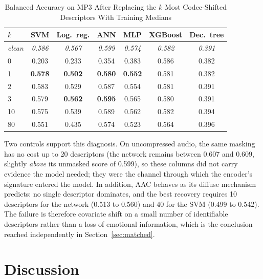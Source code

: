 \documentclass[lettersize,journal]{IEEEtran}
\begin{document}
\begin{table}[!t]
\caption{Balanced Accuracy on MP3 After Replacing the $k$ Most Codec-Shifted Descriptors With Training Medians}
\label{tab:neutralise}
\centering
\footnotesize
\setlength{\tabcolsep}{4pt}
\begin{tabular}{@{}lcccccc@{}}
\toprule
$k$ & SVM & Log.\ reg. & ANN & MLP & XGBoost & Dec.\ tree\\
\midrule
\textit{clean} & \textit{0.586} & \textit{0.567} & \textit{0.599} & \textit{0.574} & \textit{0.582} & \textit{0.391}\\
0  & 0.203 & 0.233 & 0.354 & 0.383 & 0.586 & 0.382\\
\textbf{1} & \textbf{0.578} & \textbf{0.502} & \textbf{0.580} & \textbf{0.552} & 0.581 & 0.382\\
2  & 0.583 & 0.529 & 0.587 & 0.554 & 0.581 & 0.391\\
3  & 0.579 & \textbf{0.562} & \textbf{0.595} & 0.565 & 0.580 & 0.391\\
10 & 0.575 & 0.539 & 0.589 & 0.562 & 0.582 & 0.394\\
80 & 0.551 & 0.435 & 0.574 & 0.523 & 0.564 & 0.396\\
\bottomrule
\end{tabular}
\end{table}

Two controls support this diagnosis. On uncompressed audio, the same masking
has no cost up to 20 descriptors (the network remains between 0.607 and 0.609,
slightly \emph{above} its unmasked score of 0.599), so these columns did not
carry evidence the model needed; they were the channel through which the
encoder's signature entered the model. In addition, AAC behaves as its diffuse
mechanism predicts: no single descriptor dominates, and the best recovery
requires 10 descriptors for the network (0.513 to 0.560) and 40 for the SVM
(0.499 to 0.542). The failure is therefore covariate shift on a small number of
identifiable descriptors rather than a loss of emotional information, which is
the conclusion reached independently in Section~\ref{sec:matched}.

\section{Discussion}
\end{document}
